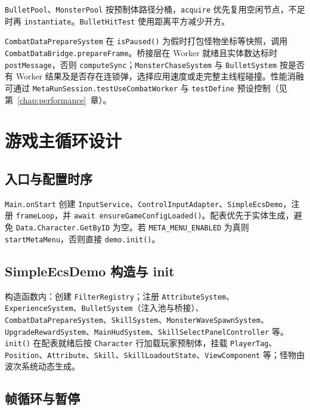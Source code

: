 \texttt{BulletPool}、\texttt{MonsterPool} 按预制体路径分桶，\texttt{acquire} 优先复用空闲节点，不足时再 \texttt{instantiate}。\texttt{BulletHitTest} 使用距离平方减少开方。

\texttt{CombatDataPrepareSystem} 在 \texttt{isPaused()} 为假时打包怪物坐标等快照，调用 \texttt{CombatDataBridge.prepareFrame}。桥接层在 Worker 就绪且实体数达标时 \texttt{postMessage}，否则 \texttt{computeSync}；\texttt{MonsterChaseSystem} 与 \texttt{BulletSystem} 按是否有 Worker 结果及是否存在连锁弹，选择应用速度或走完整主线程碰撞。性能消融可通过 \texttt{MetaRunSession.testUseCombatWorker} 与 \texttt{testDefine} 预设控制（见第~\ref{chap:performance}~章）。

\section{游戏主循环设计}
\label{sec:main-loop}

\subsection{入口与配置时序}

\texttt{Main.onStart} 创建 \texttt{InputService}、\texttt{ControlInputAdapter}、\texttt{SimpleEcsDemo}，注册 \texttt{frameLoop}，并 \texttt{await ensureGameConfigLoaded()}。配表优先于实体生成，避免 \texttt{Data.Character.GetByID} 为空。若 \texttt{META\_MENU\_ENABLED} 为真则 \texttt{startMetaMenu}，否则直接 \texttt{demo.init()}。

\subsection{SimpleEcsDemo 构造与 init}

构造函数内：创建 \texttt{FilterRegistry}；注册 \texttt{AttributeSystem}、\texttt{ExperienceSystem}、\texttt{BulletSystem}（注入池与桥接）、\texttt{CombatDataPrepareSystem}、\texttt{SkillSystem}、\texttt{MonsterWaveSpawnSystem}、\texttt{UpgradeRewardSystem}、\texttt{MainHudSystem}、\texttt{SkillSelectPanelController} 等。\texttt{init()} 在配表就绪后按 \texttt{Character} 行加载玩家预制体，挂载 \texttt{PlayerTag}、\texttt{Position}、\texttt{Attribute}、\texttt{Skill}、\texttt{SkillLoadoutState}、\texttt{ViewComponent} 等；怪物由波次系统动态生成。

\subsection{帧循环与暂停}

